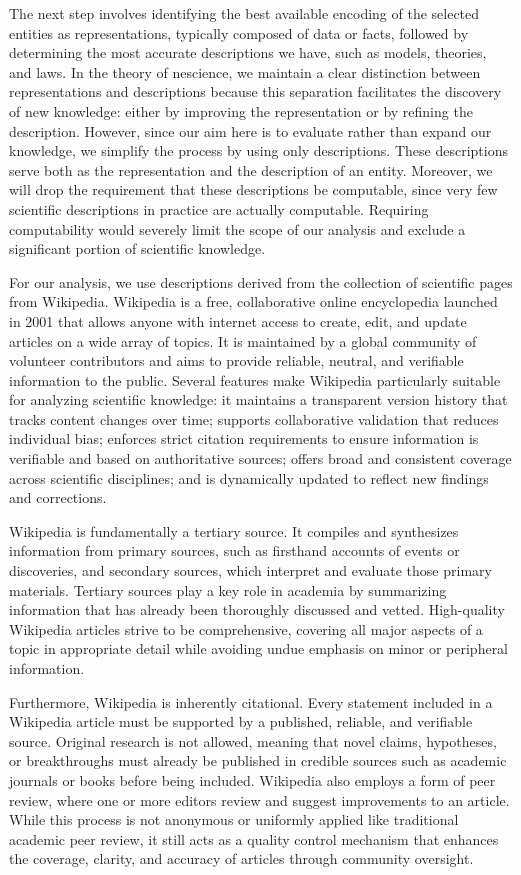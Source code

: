 The next step involves identifying the best available encoding of the selected entities as representations, typically composed of data or facts, followed by determining the most accurate descriptions we have, such as models, theories, and laws. In the theory of nescience, we maintain a clear distinction between representations and descriptions because this separation facilitates the discovery of new knowledge: either by improving the representation or by refining the description. However, since our aim here is to evaluate rather than expand our knowledge, we simplify the process by using only descriptions. These descriptions serve both as the representation and the description of an entity. Moreover, we will drop the requirement that these descriptions be computable, since very few scientific descriptions in practice are actually computable. Requiring computability would severely limit the scope of our analysis and exclude a significant portion of scientific knowledge.

For our analysis, we use descriptions derived from the collection of scientific pages from Wikipedia. Wikipedia is a free, collaborative online encyclopedia launched in 2001 that allows anyone with internet access to create, edit, and update articles on a wide array of topics. It is maintained by a global community of volunteer contributors and aims to provide reliable, neutral, and verifiable information to the public. Several features make Wikipedia particularly suitable for analyzing scientific knowledge: it maintains a transparent version history that tracks content changes over time; supports collaborative validation that reduces individual bias; enforces strict citation requirements to ensure information is verifiable and based on authoritative sources; offers broad and consistent coverage across scientific disciplines; and is dynamically updated to reflect new findings and corrections.

Wikipedia is fundamentally a tertiary source. It compiles and synthesizes information from primary sources, such as firsthand accounts of events or discoveries, and secondary sources, which interpret and evaluate those primary materials. Tertiary sources play a key role in academia by summarizing information that has already been thoroughly discussed and vetted. High-quality Wikipedia articles strive to be comprehensive, covering all major aspects of a topic in appropriate detail while avoiding undue emphasis on minor or peripheral information.

Furthermore, Wikipedia is inherently citational. Every statement included in a Wikipedia article must be supported by a published, reliable, and verifiable source. Original research is not allowed, meaning that novel claims, hypotheses, or breakthroughs must already be published in credible sources such as academic journals or books before being included. Wikipedia also employs a form of peer review, where one or more editors review and suggest improvements to an article. While this process is not anonymous or uniformly applied like traditional academic peer review, it still acts as a quality control mechanism that enhances the coverage, clarity, and accuracy of articles through community oversight.

